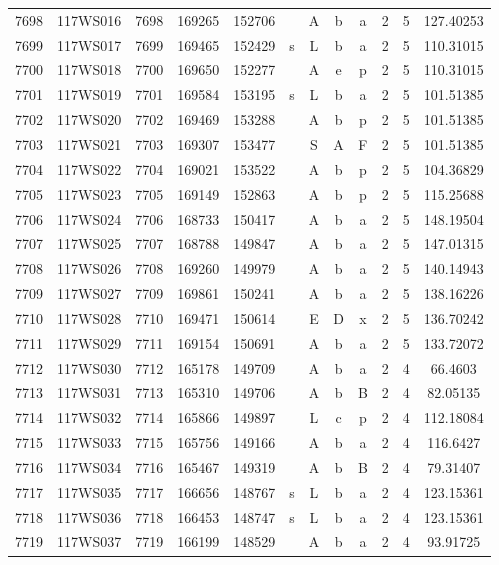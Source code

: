 \begin{tabular}{|*{12}{c|}}
7698 & 117WS016 & 7698 & 169265 & 152706 &  & A & b & a & 2 & 5 & 127.40253 \\ 
7699 & 117WS017 & 7699 & 169465 & 152429 & s & L & b & a & 2 & 5 & 110.31015 \\ 
7700 & 117WS018 & 7700 & 169650 & 152277 &  & A & e & p & 2 & 5 & 110.31015 \\ 
7701 & 117WS019 & 7701 & 169584 & 153195 & s & L & b & a & 2 & 5 & 101.51385 \\ 
7702 & 117WS020 & 7702 & 169469 & 153288 &  & A & b & p & 2 & 5 & 101.51385 \\ 
7703 & 117WS021 & 7703 & 169307 & 153477 &  & S & A & F & 2 & 5 & 101.51385 \\ 
7704 & 117WS022 & 7704 & 169021 & 153522 &  & A & b & p & 2 & 5 & 104.36829 \\ 
7705 & 117WS023 & 7705 & 169149 & 152863 &  & A & b & p & 2 & 5 & 115.25688 \\ 
7706 & 117WS024 & 7706 & 168733 & 150417 &  & A & b & a & 2 & 5 & 148.19504 \\ 
7707 & 117WS025 & 7707 & 168788 & 149847 &  & A & b & a & 2 & 5 & 147.01315 \\ 
7708 & 117WS026 & 7708 & 169260 & 149979 &  & A & b & a & 2 & 5 & 140.14943 \\ 
7709 & 117WS027 & 7709 & 169861 & 150241 &  & A & b & a & 2 & 5 & 138.16226 \\ 
7710 & 117WS028 & 7710 & 169471 & 150614 &  & E & D & x & 2 & 5 & 136.70242 \\ 
7711 & 117WS029 & 7711 & 169154 & 150691 &  & A & b & a & 2 & 5 & 133.72072 \\ 
7712 & 117WS030 & 7712 & 165178 & 149709 &  & A & b & a & 2 & 4 & 66.4603 \\ 
7713 & 117WS031 & 7713 & 165310 & 149706 &  & A & b & B & 2 & 4 & 82.05135 \\ 
7714 & 117WS032 & 7714 & 165866 & 149897 &  & L & c & p & 2 & 4 & 112.18084 \\ 
7715 & 117WS033 & 7715 & 165756 & 149166 &  & A & b & a & 2 & 4 & 116.6427 \\ 
7716 & 117WS034 & 7716 & 165467 & 149319 &  & A & b & B & 2 & 4 & 79.31407 \\ 
7717 & 117WS035 & 7717 & 166656 & 148767 & s & L & b & a & 2 & 4 & 123.15361 \\ 
7718 & 117WS036 & 7718 & 166453 & 148747 & s & L & b & a & 2 & 4 & 123.15361 \\ 
7719 & 117WS037 & 7719 & 166199 & 148529 &  & A & b & a & 2 & 4 & 93.91725 \\ 

\end{tabular}
